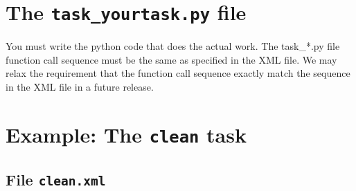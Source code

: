 
\section{The {\tt task\_yourtask.py} file}
\label{section:write.py}

You must write the python code that does the actual work. The
task\_*.py file function call sequence must be the same as specified
in the XML file. We may relax the requirement that the function call
sequence exactly match the sequence in the XML file in a future
release.


\section{Example: The {\tt clean} task}
\label{section:write.clean}


\subsection{File {\tt clean.xml} }
\label{section:write.clean.xml}

